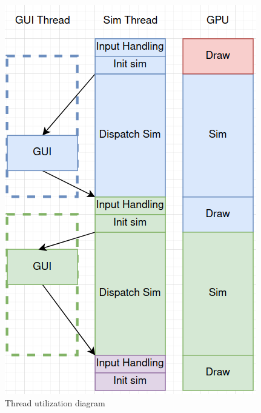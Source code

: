 \begin{figure}[ht]
    \centering
    \centerline{\includegraphics[width=0.5\linewidth]{Ch42Design/figures/threading_usage_2.png}}
    \caption{Thread utilization diagram}
    \label{fig:CurrentSwimlane}
\end{figure}